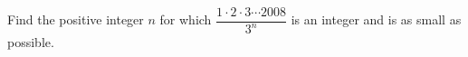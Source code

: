 Find the positive integer $n$ for which $\dfrac{1\cdot2\cdot3\cdots2008}{3^n}$ is an integer and is as small as possible.
